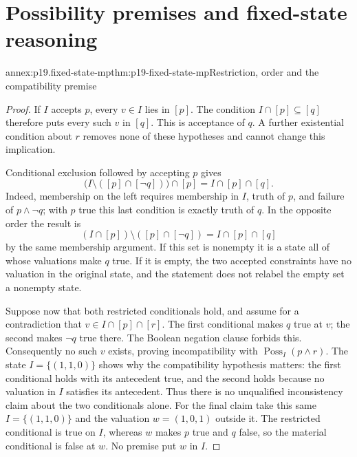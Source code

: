 \section{Possibility premises and fixed-state reasoning}
\label{sec:annex-p19-conditional-interpretation-experiments}

\begin{annexitem}{annex:p19.fixed-state-mp}{thm:p19-fixed-state-mp}{Restriction, order and the compatibility premise}
\begin{proof}
If \(I\) accepts \(p\), every \(v\in I\) lies in \([p]\).
The condition \(I\cap[p]\subseteq[q]\) therefore puts every such
\(v\) in \([q]\). This is acceptance of \(q\). A further existential
condition about \(r\) removes none of these hypotheses and cannot change
this implication.

Conditional exclusion followed by accepting \(p\) gives
\[
 \bigl(I\setminus([p]\cap[\neg q])\bigr)\cap[p]
 =I\cap[p]\cap[q].
\]
Indeed, membership on the left requires membership in \(I\), truth of
\(p\), and failure of \(p\land\neg q\); with \(p\) true this last
condition is exactly truth of \(q\). In the opposite order the result is
\[
 (I\cap[p])\setminus([p]\cap[\neg q])=I\cap[p]\cap[q]
\]
by the same membership argument. If this set is nonempty it is a state
all of whose valuations make \(q\) true. If it is empty, the two accepted
constraints have no valuation in the original state, and the statement
does not relabel the empty set a nonempty state.

Suppose now that both restricted conditionals hold, and assume for a
contradiction that \(v\in I\cap[p]\cap[r]\). The first conditional makes
\(q\) true at \(v\); the second makes \(\neg q\) true there. The Boolean
negation clause forbids this. Consequently no such \(v\) exists, proving
incompatibility with \(\operatorname{Poss}_I(p\land r)\). The state
\(I=\{(1,1,0)\}\) shows why the compatibility hypothesis matters: the
first conditional holds with its antecedent true, and the second holds
because no valuation in \(I\) satisfies its antecedent. Thus there is no
unqualified inconsistency claim about the two conditionals alone.
For the final claim take this same \(I=\{(1,1,0)\}\) and the valuation
\(w=(1,0,1)\) outside it. The restricted conditional is true on \(I\),
whereas \(w\) makes \(p\) true and \(q\) false, so the material
conditional is false at \(w\). No premise put \(w\) in \(I\).
\end{proof}
\end{annexitem}

